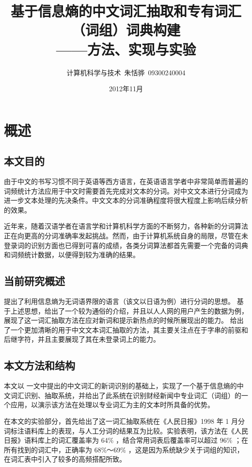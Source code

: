 \documentclass[UTF8]{ctexart}
\begin{document}
\title{基于信息熵的中文词汇抽取和专有词汇（词组）词典构建 \\
\large{——方法、实现与实验}}


\author{计算机科学与技术\ 朱恬骅\ 09300240004}
\date{2012年11月}
\maketitle

\section{概述}
\subsection{本文目的}
由于中文的书写习惯不同于英语等西方语言，在英语语言学者中非常简单而普遍的词频统计方法应用于中文时需要首先完成对文本的分词。对中文文本进行分词成为进一步文本处理的先决条件。中文文本的分词准确程度将很大程度上影响后续分析的效果。

近年来，随着汉语学者在语言学和计算机科学方面的不断努力，各种新的分词算法正在向更高的分词准确率发起挑战。然而，由于计算机系统自身的局限，尽管在未登录词的识别方面也已得到可喜的成绩，各类分词算法都首先需要一个完备的词典和词频统计数据，以便得到较为准确的结果。

\subsection{当前研究概述}
\cite{Yamamoto:2001:USA:972778.972779} 提出了利用信息熵为无词语界限的语言（该文以日语为例）进行分词的思想。
\cite{GuSenProgrammer} 基于上述思想，给出了一个较为通俗的介绍，并且以人人网的用户产生的数据为例，展现了这一词汇抽取方法在应对新词和提示新热点的时候所展现出的能力。\cite{Feng:2004:AVC:1005380.1005384} 给出了一个更加清晰的用于中文文本词汇抽取的方法，其主要关注点在于字串的前驱和后继字符，并且主要展现了其在未登录词上的能力。

\subsection{本文方法和结构}
本文以\cite{GuSenProgrammer} 一文中提出的中文词汇的新词识别的基础上，实现了一个基于信息熵的中文词汇识别、抽取系统，并给出了此系统在识别财经新闻中专业词汇（词组）的一个应用，以演示该方法在处理以专业词汇为主的文本时所具备的优势。

在本文的实验部分，首先给出了这一词汇抽取系统在《人民日报》1998 年 1 月分词标注语料库上的表现，与人工分词的结果互为比较。实验表明，该方法在《人民日报》语料库上的词汇覆盖率为 64\% ，结合常用词表后覆盖率可以超过 96\% ；在所有找到的词汇中，正确率为 68\%～69\% ，这是因为系统缺少关于词组的知识，在词汇表中引入了较多的高频搭配所致。
\end{document}
